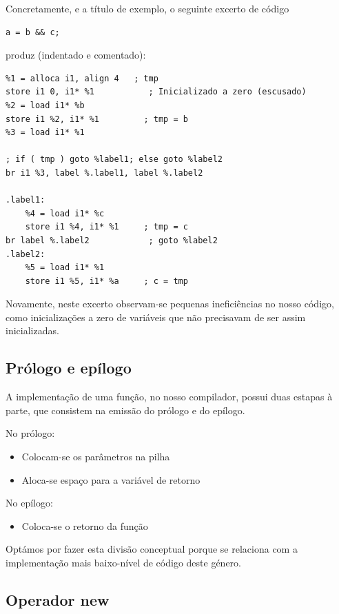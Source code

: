 \documentclass[11pt,a4paper]{article}
\begin{document}
Concretamente, e a título de exemplo, o seguinte excerto de código
\begin{lstlisting}
a = b && c;
\end{lstlisting}

produz (indentado e comentado):

\begin{lstlisting}
%1 = alloca i1, align 4   ; tmp
store i1 0, i1* %1           ; Inicializado a zero (escusado)
%2 = load i1* %b
store i1 %2, i1* %1         ; tmp = b
%3 = load i1* %1

; if ( tmp ) goto %label1; else goto %label2
br i1 %3, label %.label1, label %.label2  

.label1:
    %4 = load i1* %c
    store i1 %4, i1* %1     ; tmp = c
br label %.label2            ; goto %label2
.label2:
    %5 = load i1* %1                                   
    store i1 %5, i1* %a     ; c = tmp
\end{lstlisting}

Novamente, neste excerto observam-se pequenas ineficiências no nosso código, como inicializações a zero de variáveis que não precisavam de ser assim inicializadas.

\subsection{Prólogo e epílogo}

A implementação de uma função, no nosso compilador, possui duas estapas à parte, que consistem na emissão do prólogo e do epílogo.

No prólogo:

\begin{itemize}
  \item Colocam-se os parâmetros na pilha
  \item Aloca-se espaço para a variável de retorno
\end{itemize}

No epílogo:

\begin{itemize}
  \item Coloca-se o retorno da função
\end{itemize}

Optámos por fazer esta divisão conceptual porque se relaciona com a implementação mais baixo-nível de código deste género.

\subsection{Operador new}
\end{document}
